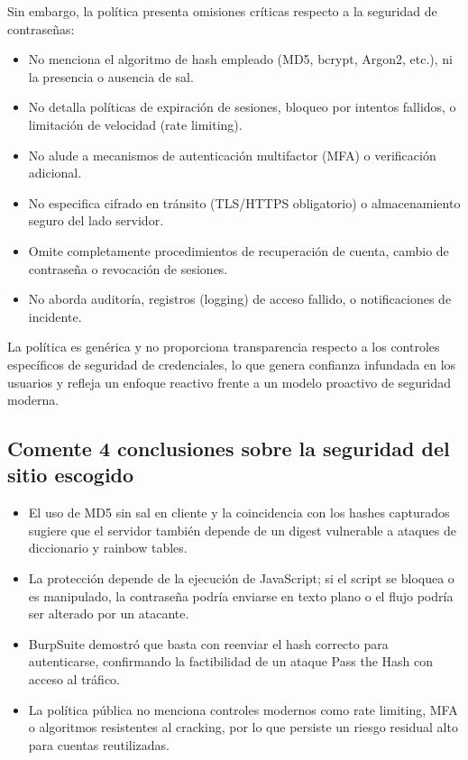 \documentclass[letter,12pt]{article}
\begin{document}
Sin embargo, la política presenta omisiones críticas respecto a la seguridad de contraseñas:

\begin{itemize}
  \item No menciona el algoritmo de hash empleado (MD5, bcrypt, Argon2, etc.), ni la presencia o ausencia de sal.
  \item No detalla políticas de expiración de sesiones, bloqueo por intentos fallidos, o limitación de velocidad (rate limiting).
  \item No alude a mecanismos de autenticación multifactor (MFA) o verificación adicional.
  \item No especifica cifrado en tránsito (TLS/HTTPS obligatorio) o almacenamiento seguro del lado servidor.
  \item Omite completamente procedimientos de recuperación de cuenta, cambio de contraseña o revocación de sesiones.
  \item No aborda auditoría, registros (logging) de acceso fallido, o notificaciones de incidente.
\end{itemize}

La política es genérica y no proporciona transparencia respecto a los controles específicos de seguridad de credenciales, lo que genera confianza infundada en los usuarios y refleja un enfoque reactivo frente a un modelo proactivo de seguridad moderna.

\subsection{Comente 4 conclusiones sobre la seguridad del sitio escogido}

\begin{itemize}
  \item El uso de MD5 sin sal en cliente y la coincidencia con los hashes capturados sugiere que el servidor también depende de un digest vulnerable a ataques de diccionario y rainbow tables.
  \item La protección depende de la ejecución de JavaScript; si el script se bloquea o es manipulado, la contraseña podría enviarse en texto plano o el flujo podría ser alterado por un atacante.
  \item BurpSuite demostró que basta con reenviar el hash correcto para autenticarse, confirmando la factibilidad de un ataque Pass the Hash con acceso al tráfico.
  \item La política pública no menciona controles modernos como rate limiting, MFA o algoritmos resistentes al cracking, por lo que persiste un riesgo residual alto para cuentas reutilizadas.
\end{itemize}

\end{document}
